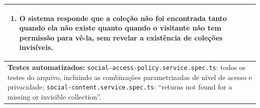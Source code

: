 \begin{quadro}[h!]
\begin{tabular}{|p{\dimexpr\linewidth-2\tabcolsep-2\arrayrulewidth\relax}|}
\begin{enumerate}[nosep,leftmargin=1.2em,topsep=2pt,partopsep=0pt,parsep=0pt,itemsep=1pt]
  \item O sistema responde que a coleção não foi encontrada tanto quando ela não existe quanto quando o visitante não tem permissão para vê-la, sem revelar a existência de coleções invisíveis.
\end{enumerate} \\ \hline
\textbf{Testes automatizados:} \texttt{social-access-policy.service.spec.ts}: todos os testes do arquivo, incluindo as combinações parametrizadas de nível de acesso e privacidade; \texttt{social-content.service.spec.ts}: ``returns not found for a missing or invisible collection''. \\ \hline
\end{tabular}
\end{quadro}

\FloatBarrier
